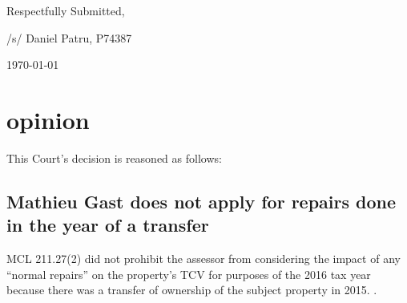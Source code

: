 \documentclass[12pt,\documentclassflag]{michiganCourtOfAppealsBrief}
\begin{document}
{ \setlength{\leftskip}{3.5in}

  Respectfully Submitted,

  /s/ Daniel Patru, P74387

\today

  \setlength{\leftskip}{0pt}}

\section{opinion}
This Court's decision is reasoned as follows:

\subsection{Mathieu Gast does not apply for repairs done in the year of a transfer}

MCL 211.27(2) did not prohibit the assessor from considering the impact
of any ``normal repairs'' on the property's TCV for purposes of the 2016 tax year because there was a transfer of ownership of the
subject property in 2015. .
\end{document}
